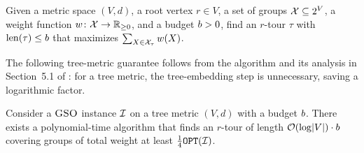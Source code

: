 \begin{problem} \label{problem:GSO}
Given a metric space $(V, d)$, a root vertex $r \in V$, a set of groups $\mathcal{X} \subseteq 2^V$, a weight function $w\colon \mathcal{X} \to \mathbb{R}_{\geq 0}$, and a budget $b > 0$, find an $r$-tour $\tau$ with $\operatorname{len}\mathopen{}\left( \tau \right) \leq b$ that maximizes
$\sum_{X \in \mathcal{X}_\tau} w(X)$.
\end{problem}
The following tree-metric guarantee follows from the algorithm and its analysis in Section~5.1 of \cite{ApproxAlgsForOptDTsAndAdapTSPProblems}: for a tree metric, the tree-embedding step is unnecessary, saving a logarithmic factor.
\begin{theorem}\label{thm:gso-tree-source}
    Consider a $\textup{\textsc{GSO}}$ instance $\mathcal{I}$ on a tree metric $(V,d)$ with a budget $b$.
    There exists a polynomial-time algorithm that finds an $r$-tour of length $\mathcal{O}\mathopen{}\left( \log\mathopen{}\left| V \right| \right)\cdot b$ covering groups of total weight at least $\frac{1}{4}\texttt{OPT}\mathopen{}\left( \mathcal{I} \right)$.
\end{theorem}

